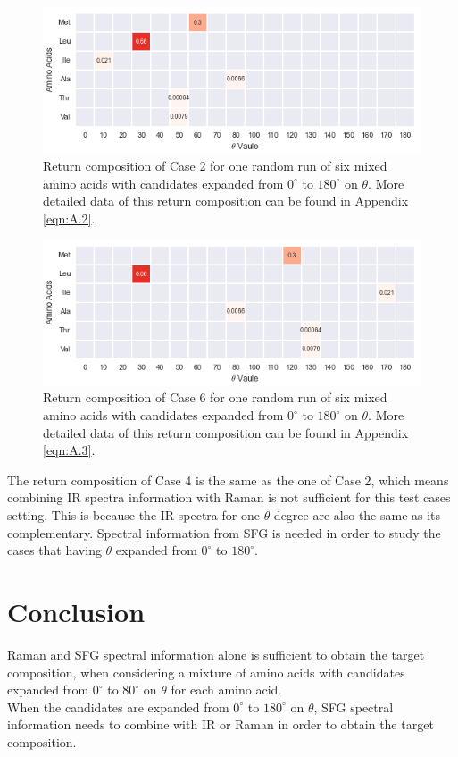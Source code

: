 \begin{figure}[!ht] 
\centering
\includegraphics[scale=0.9]{Figures/mixture_return_composition_of_E1_for_one_run_theta_0_180.png}
\caption{Return composition of Case 2 for one random run of six mixed amino acids with candidates expanded from $0^{\circ}$ to $180^{\circ}$ on $\theta$. More detailed data of this return composition can be found in Appendix \ref{eqn:A.2}.} 
\label{fig:5.5}
\end{figure}

\begin{figure}[!ht] 
\centering
\includegraphics[scale=0.9]{Figures/mixture_return_composition_of_E6_for_one_run_theta_0_180.png}
\caption{Return composition of Case 6 for one random run of six mixed amino acids with candidates expanded from $0^{\circ}$ to $180^{\circ}$ on $\theta$. More detailed data of this return composition can be found in Appendix \ref{eqn:A.3}.} 
\label{fig:5.6}
\end{figure}

The return composition of Case 4 is the same as the one of Case 2, which means combining IR spectra information with Raman is not sufficient for this test cases setting. This is because the IR spectra for one $\theta$ degree are also the same as its complementary. Spectral information from SFG is needed in order to study the cases that having $\theta$ expanded from $0^{\circ}$ to $180^{\circ}$. \\


\section{Conclusion}
Raman and SFG spectral information alone is sufficient to obtain the target composition, when considering a mixture of amino acids with candidates expanded from $0^{\circ}$ to $80^{\circ}$ on $\theta$ for each amino acid. \\

When the candidates are expanded from $0^{\circ}$ to $180^{\circ}$ on $\theta$, SFG spectral information needs to combine with IR or Raman in order to obtain the target composition. \\
